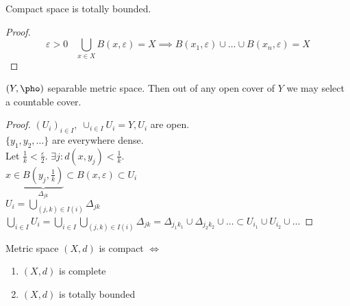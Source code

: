 
\begin{statement}
  Compact space is totally bounded.
\end{statement}

\begin{proof}
  \[ \varepsilon>0 \;\;\; \bigcup_{x \in X}B(x,\varepsilon) = X \implies B(x_1,\varepsilon) \cup \ldots\cup B(x_n,\varepsilon) = X \] 
\end{proof}

\begin{lemma} \label{lemma:separable-space-then-open-cover-select-countable-cover}
  $(Y, \pho)$ separable metric space. Then out of any open cover of $Y$ we may select
  a countable cover.
\end{lemma}

\begin{proof}
  $(U_i)_{i \in I}, \; \cup_{i \in  I} U_i = Y, U_i$ are open.\\
  $\{y_1, y_2, \ldots\} $ are everywhere dense.\\
  Let $\frac{1}{k} < \frac{\varepsilon}{2}$. $\exists j: d(x,y_j) < \frac{1}{k}$.\\
  $x \in  \underbrace{B(y_j, \frac{1}{k})}_{\Delta_{jk}} \subset B(x,\varepsilon) \subset U_i$ \\
  $U_i = \bigcup_{(j,k) \in  I(i)} \Delta_{j k}$ \\
  $\bigcup_{i \in I} U_i = \bigcup_{i \in I} \bigcup_{(j, k) \in  I(i)} \Delta_{j k} = \Delta_{j_1 k_1} \cup \Delta_{j_2 k_2} \cup \ldots \subset U_{i_1} \cup U_{i_2}\cup \ldots$
\end{proof}

\begin{theorem}
  Metric space $(X,d)$ is compact $\iff$
  \begin{enumerate}
    \item $(X,d)$ is complete
    \item $(X,d)$ is totally bounded
  \end{enumerate}
\end{theorem}

